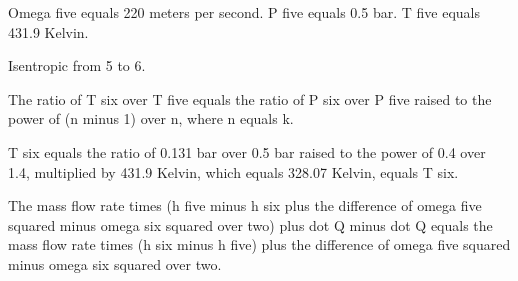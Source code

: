 Omega five equals 220 meters per second.
P five equals 0.5 bar.
T five equals 431.9 Kelvin.

Isentropic from 5 to 6.

The ratio of T six over T five equals the ratio of P six over P five raised to the power of (n minus 1) over n, where n equals k.

T six equals the ratio of 0.131 bar over 0.5 bar raised to the power of 0.4 over 1.4, multiplied by 431.9 Kelvin, which equals 328.07 Kelvin, equals T six.

The mass flow rate times (h five minus h six plus the difference of omega five squared minus omega six squared over two) plus dot Q minus dot Q equals the mass flow rate times (h six minus h five) plus the difference of omega five squared minus omega six squared over two.